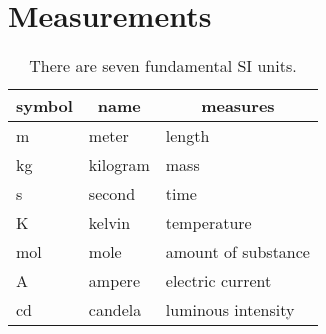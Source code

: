 
\section{Measurements}



\begin{table}[H]
  \centering
  \caption{There are seven fundamental SI units.}
  \begin{tabular}{lll}
    \toprule
    \multicolumn{1}{c}{\bfseries symbol}
    &\multicolumn{1}{c}{\bfseries name}
    &\multicolumn{1}{c}{\bfseries measures}%
    \\%
    \midrule%
    \si{\meter} & meter & length \\%
    \si{\kilo\gram} & kilogram & mass \\%
    \si{\second} & second & time \\%
    \si{\kelvin} & kelvin & temperature \\%
    \si{\mole} & mole & amount of substance \\%
    \si{\ampere} & ampere & electric current \\%
    \si{\candela} & candela & luminous intensity \\%
    \bottomrule
  \end{tabular}
\end{table}


